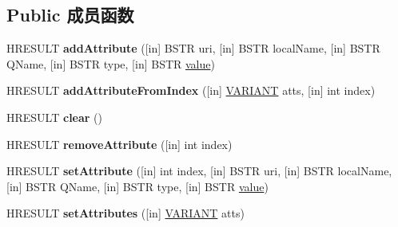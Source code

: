 \subsection*{Public 成员函数}
\begin{DoxyCompactItemize}
\item 
\mbox{\label{interface_m_s_x_m_l2_1_1_i_m_x_attributes_a33924685cb6af8f67741e1d91ac93afa}} 
H\+R\+E\+S\+U\+LT {\bfseries add\+Attribute} (\mbox{[}in\mbox{]} B\+S\+TR uri, \mbox{[}in\mbox{]} B\+S\+TR local\+Name, \mbox{[}in\mbox{]} B\+S\+TR Q\+Name, \mbox{[}in\mbox{]} B\+S\+TR type, \mbox{[}in\mbox{]} B\+S\+TR \hyperlink{unionvalue}{value})
\item 
\mbox{\label{interface_m_s_x_m_l2_1_1_i_m_x_attributes_a7c4547f45667272260fbc1542b3d2043}} 
H\+R\+E\+S\+U\+LT {\bfseries add\+Attribute\+From\+Index} (\mbox{[}in\mbox{]} \hyperlink{structtag_v_a_r_i_a_n_t}{V\+A\+R\+I\+A\+NT} atts, \mbox{[}in\mbox{]} int index)
\item 
\mbox{\label{interface_m_s_x_m_l2_1_1_i_m_x_attributes_a95baeb45ff73dc3b3ac10605aaaa4b2a}} 
H\+R\+E\+S\+U\+LT {\bfseries clear} ()
\item 
\mbox{\label{interface_m_s_x_m_l2_1_1_i_m_x_attributes_a39d0193fbe46abfbe5c11244e5a8db18}} 
H\+R\+E\+S\+U\+LT {\bfseries remove\+Attribute} (\mbox{[}in\mbox{]} int index)
\item 
\mbox{\label{interface_m_s_x_m_l2_1_1_i_m_x_attributes_a1c638e41e142d66d013d0a0b0ccb3c07}} 
H\+R\+E\+S\+U\+LT {\bfseries set\+Attribute} (\mbox{[}in\mbox{]} int index, \mbox{[}in\mbox{]} B\+S\+TR uri, \mbox{[}in\mbox{]} B\+S\+TR local\+Name, \mbox{[}in\mbox{]} B\+S\+TR Q\+Name, \mbox{[}in\mbox{]} B\+S\+TR type, \mbox{[}in\mbox{]} B\+S\+TR \hyperlink{unionvalue}{value})
\item 
\mbox{\label{interface_m_s_x_m_l2_1_1_i_m_x_attributes_a8f09bc4910315612e54d2202df352ae9}} 
H\+R\+E\+S\+U\+LT {\bfseries set\+Attributes} (\mbox{[}in\mbox{]} \hyperlink{structtag_v_a_r_i_a_n_t}{V\+A\+R\+I\+A\+NT} atts)
\item 

\end{DoxyCompactItemize}
